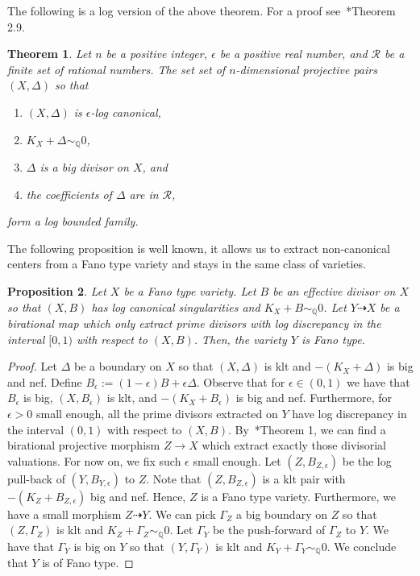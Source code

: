 \documentclass{amsart}
\renewcommand{\qq}{\mathbb{Q}}
\newtheorem{theorem}{Theorem}[section]
\newtheorem{proposition}[theorem]{Proposition}
\theoremstyle{remark}
\numberwithin{equation}{section}
\begin{document}
The following is a log version of the above theorem. For a proof see~\cite{FM18}*{Theorem 2.9}.

\begin{theorem}\label{thm:log-ft-bdness}
Let $n$ be a positive integer,
$\epsilon$ be a positive real number,
and $\mathcal{R}$ be a finite set of rational numbers.
The set set of $n$-dimensional projective pairs $(X,\Delta)$ so that
\begin{enumerate}
    \item $(X,\Delta)$ is $\epsilon$-log canonical,
    \item $K_X+\Delta\sim_\qq 0$, 
    \item $\Delta$ is a big divisor on $X$, and
    \item the coefficients of $\Delta$ are in $\mathcal{R}$,
\end{enumerate}
form a log bounded family.
\end{theorem}

The following proposition is well known, it allows us to extract non-canonical centers from a Fano type variety and stays in the same class of varieties.

\begin{proposition}\label{prop:FT-extraction-non-canonical}
Let $X$ be a Fano type variety.
Let $B$ be an effective divisor on $X$ so that
$(X,B)$ has log canonical singularities and
$K_X+B\sim_\qq 0$.
Let $Y\dashrightarrow X$ be a birational map which only extract prime divisors with log discrepancy in the interval $[0,1)$ with respect to $(X,B)$.
Then, the variety $Y$ is Fano type.
\end{proposition}

\begin{proof}
Let $\Delta$ be a boundary on $X$ so that
$(X,\Delta)$ is klt and $-(K_X+\Delta)$ is big and nef.
Define $B_\epsilon:= (1-\epsilon)B+\epsilon\Delta$.
Observe that for $\epsilon \in (0,1)$ we have that
$B_\epsilon$ is big, 
$(X,B_\epsilon)$ is klt,
and $-(K_X+B_{\epsilon})$ is big and nef.
Furthermore, for $\epsilon>0$ small enough,
all the prime divisors extracted on $Y$
have log discrepancy in the interval $(0,1)$ with respect to $(X,B)$.
By~\cite{Mor19}*{Theorem 1}, we can find a birational projective morphism
$Z\rightarrow X$ which extract exactly those divisorial valuations.
For now on, we fix such $\epsilon$ small enough.
Let $(Z,B_{Z,\epsilon})$ be the log pull-back 
of $(Y,B_{Y,\epsilon})$ to $Z$.
Note that $(Z,B_{Z,\epsilon})$ is a klt pair
with $-(K_Z+B_{Z,\epsilon})$ big and nef.
Hence, $Z$ is a Fano type variety.
Furthermore, we have a small morphism $Z\dashrightarrow Y$.
We can pick $\Gamma_Z$ a big boundary on $Z$ so that
$(Z,\Gamma_Z)$ is klt and $K_Z+\Gamma_Z\sim_\qq0$.
Let $\Gamma_Y$ be the push-forward of $\Gamma_Z$ to $Y$.
We have that $\Gamma_Y$ is big on $Y$ so that
$(Y,\Gamma_Y)$ is klt and $K_Y+\Gamma_Y\sim_\qq 0$.
We conclude that $Y$ is of Fano type.
\end{proof}
\end{document}
